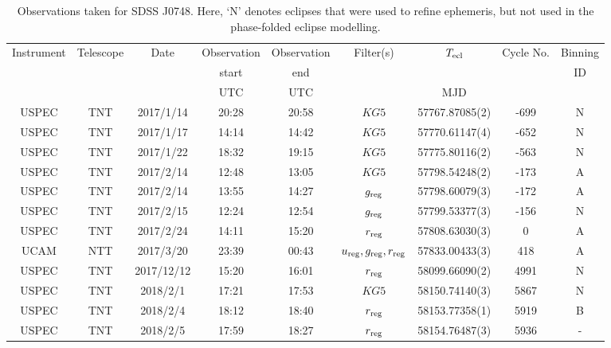 \begin{table}
	\begin{center}
		\caption{Observations taken for SDSS J0748. Here, `N' denotes eclipses that were used to refine ephemeris, but not used in the phase-folded eclipse modelling.}
		\label{table:observing:observation logs SDSS0748}
		\begin{tabular}{ccccccccc}
			\hline
			Instrument & Telescope & Date & Observation  & Observation  & Filter(s) & $T_{\rm ecl}$ & Cycle No. & Binning \\
			 &  &  &  start &  end &  &  &  & ID \\
			 &  &  & UTC & UTC &  & MJD &  &  \\
			\hline
			\hline
			USPEC & TNT     & 2017/1/14  & 20:28 & 20:58 & $KG5$                                 & 57767.87085(2) &  -699 & N \\
			USPEC & TNT     & 2017/1/17  & 14:14 & 14:42 & $KG5$                                 & 57770.61147(4) &  -652 & N \\
			USPEC & TNT     & 2017/1/22  & 18:32 & 19:15 & $KG5$                                 & 57775.80116(2) &  -563 & N \\
			USPEC & TNT     & 2017/2/14  & 12:48 & 13:05 & $KG5$                                 & 57798.54248(2) &  -173 & A \\
			USPEC & TNT     & 2017/2/14  & 13:55 & 14:27 & $g_{\rm reg}$                         & 57798.60079(3) &  -172 & A \\
			USPEC & TNT     & 2017/2/15  & 12:24 & 12:54 & $g_{\rm reg}$                         & 57799.53377(3) &  -156 & N \\
			USPEC & TNT     & 2017/2/24  & 14:11 & 15:20 & $r_{\rm reg}$                         & 57808.63030(3) &     0 & A \\
			UCAM  & NTT     & 2017/3/20  & 23:39 & 00:43 & $u_{\rm reg},g_{\rm reg},r_{\rm reg}$ & 57833.00433(3) &   418 & A \\
			USPEC & TNT     & 2017/12/12 & 15:20 & 16:01 & $r_{\rm reg}$                         & 58099.66090(2) &  4991 & N \\
			USPEC & TNT     & 2018/2/1   & 17:21 & 17:53 & $KG5$                                 & 58150.74140(3) &  5867 & N \\
			USPEC & TNT     & 2018/2/4   & 18:12 & 18:40 & $r_{\rm reg}$                         & 58153.77358(1) &  5919 & B \\
			USPEC & TNT     & 2018/2/5   & 17:59 & 18:27 & $r_{\rm reg}$                         & 58154.76487(3) &  5936 & - \\

\end{tabular}
\end{center}
\end{table}
